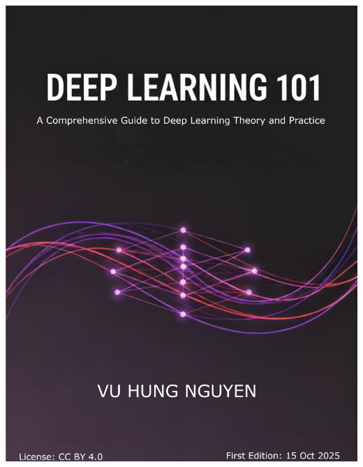 \documentclass[10pt,\papersize,twoside,openright]{book}
\theoremstyle{definition}
\theoremstyle{remark}
\begin{document}
{{{{{          \includegraphics[width=\paperwidth,height=\paperheight]{images/DeepLearning101-cover-letter.png}%
        }{%
          }}}}}
\end{document}
